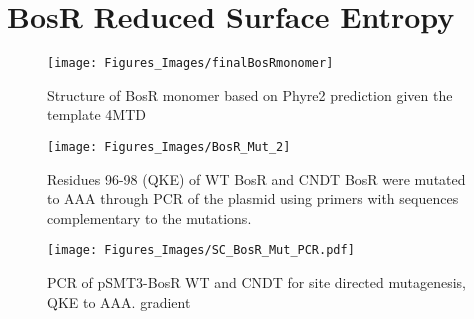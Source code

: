 \documentclass[12pt,twoside]{reedthesis}
\begin{document}
\clearpage

   \section{BosR Reduced Surface Entropy}
   
   	 	\begin{figure}[t]
   	 		
   	 		\centering
   	 		\texttt{[image: Figures\_Images/finalBosRmonomer]}
   	 		\caption[Predicted structure BosR Monomer]{Structure of BosR monomer based on Phyre2 prediction given the template 4MTD}
   	 		\label{BosRMonomer_results}
   	 	\end{figure}
   	 	
      	\begin{figure}[h!tbp]
      		
      		\centering
      		\texttt{[image: Figures\_Images/BosR\_Mut\_2]}
      		\caption[BosR Site-Directed Mutagenesis]{Residues 96-98 (QKE) of WT BosR and CNDT BosR  were mutated to AAA through PCR of the plasmid using primers with sequences complementary to the mutations. }
      		\label{BosRMut_Scheme}
      	\end{figure}
      	
   
    		 \begin{figure}[h!tbp]
    		 	\centering
    		 	\texttt{[image: Figures\_Images/SC\_BosR\_Mut\_PCR.pdf]}
    		 	\caption[BosR QKE --> AAA Site Directed Mutagenesis PCR Gel]{PCR of pSMT3-BosR WT and CNDT for site directed mutagenesis, QKE to AAA. gradient}
    		 	\label{BosRmutPCR}
    		 \end{figure}
  
\end{document}
